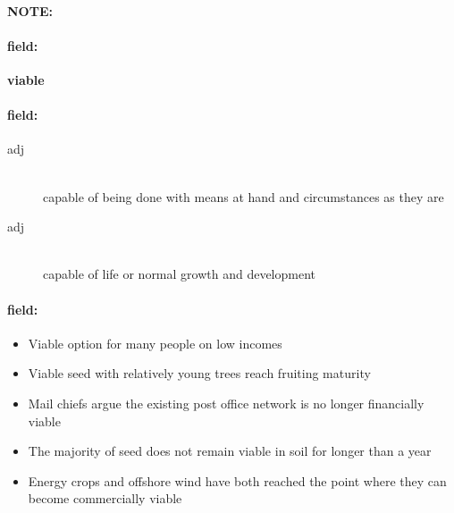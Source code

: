 \documentclass[12pt]{article}
\newenvironment{note}{\paragraph{NOTE:}}{}
\newenvironment{field}{\paragraph{field:}}{}
\begin{document}
\begin{note}
\begin{field}
\textbf{\large viable}
\end{field}


\begin{field}
\begin{description}
\item[adj] \hfill \\ 
capable of being done with means at hand and circumstances as they are

\item[adj] \hfill \\ 
capable of life or normal growth and development

\end{description}
\end{field}

\begin{field}
\begin{itemize}
\item Viable option for many people on low incomes
\item Viable seed with relatively young trees reach fruiting maturity
\item Mail chiefs argue the existing post office network is no longer financially viable
\item The majority of seed does not remain viable in soil for longer than a year
\item Energy crops and offshore wind have both reached the point where they can become commercially viable
\end{itemize}
\end{field}
\end{note}
\end{document}
